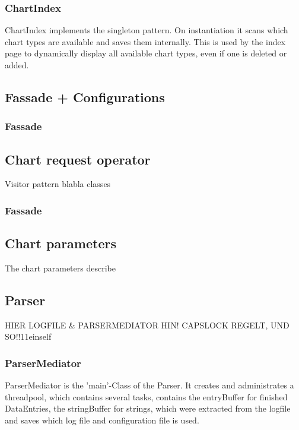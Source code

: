\subsubsection*{ChartIndex}
ChartIndex implements the singleton pattern. On instantiation it scans which chart types are available 
and saves them internally. This is used by the index page to dynamically display all available chart types,
even if one is deleted or added.

\subsection{Fassade + Configurations}
\subsubsection{Fassade}


\subsection{Chart request operator}
Visitor pattern blabla   %
classes
\subsubsection{Fassade}

\subsection{Chart parameters}
The chart parameters describe %

\subsection{}


\subsection{Parser}

HIER LOGFILE \& PARSERMEDIATOR HIN!
CAPSLOCK REGELT, UND SO!!11einself %

\subsubsection*{ParserMediator}
ParserMediator is the 'main'-Class of the Parser. It creates and administrates a threadpool, which contains several tasks, 
contains the entryBuffer for finished DataEntries, the stringBuffer for strings, which were extracted 
from the logfile and saves which log file and configuration file is used.

